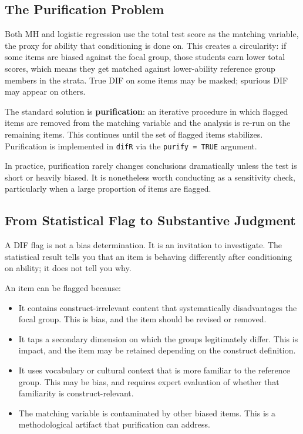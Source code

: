 \documentclass[
  11pt,
  letterpaper,
]{scrbook}
\providecommand{\tightlist}{%
  \setlength{\itemsep}{0pt}\setlength{\parskip}{0pt}}
\begin{document}
\subsection{The Purification Problem}\label{the-purification-problem}

Both MH and logistic regression use the total test score as the matching
variable, the proxy for ability that conditioning is done on. This
creates a circularity: if some items are biased against the focal group,
those students earn lower total scores, which means they get matched
against lower-ability reference group members in the strata. True DIF on
some items may be masked; spurious DIF may appear on others.

The standard solution is \textbf{purification}: an iterative procedure
in which flagged items are removed from the matching variable and the
analysis is re-run on the remaining items. This continues until the set
of flagged items stabilizes. Purification is implemented in
\texttt{difR} via the \texttt{purify\ =\ TRUE} argument.

In practice, purification rarely changes conclusions dramatically unless
the test is short or heavily biased. It is nonetheless worth conducting
as a sensitivity check, particularly when a large proportion of items
are flagged.

\subsection{From Statistical Flag to Substantive
Judgment}\label{from-statistical-flag-to-substantive-judgment}

A DIF flag is not a bias determination. It is an invitation to
investigate. The statistical result tells you that an item is behaving
differently after conditioning on ability; it does not tell you why.

An item can be flagged because:

\begin{itemize}
\tightlist
\item
  It contains construct-irrelevant content that systematically
  disadvantages the focal group. This is bias, and the item should be
  revised or removed.
\item
  It taps a secondary dimension on which the groups legitimately differ.
  This is impact, and the item may be retained depending on the
  construct definition.
\item
  It uses vocabulary or cultural context that is more familiar to the
  reference group. This may be bias, and requires expert evaluation of
  whether that familiarity is construct-relevant.
\item
  The matching variable is contaminated by other biased items. This is a
  methodological artifact that purification can address.
\end{itemize}
\end{document}
